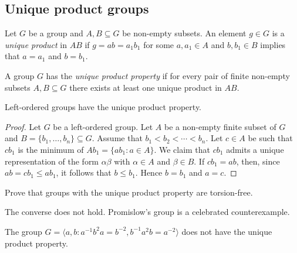 \begin{graybox}
\project
\section{Unique product groups}
\label{section:UP}

Let $G$ be a group and $A,B\subseteq G$ be non-empty subsets. 
An element $g\in G$ is a \emph{unique product} in $AB$ if $g=ab=a_1b_1$ for some
$a,a_1\in
A$ and $b,b_1\in B$ implies that $a=a_1$ and $b=b_1$.

\begin{definition}
	A group $G$ has the \emph{unique product property} if 
	for every pair of finite non-empty subsets $A,B\subseteq G$ there exists at least one
	unique product in $AB$.
\end{definition}

\begin{proposition}
    Left-ordered groups have the unique product property.
\end{proposition}

\begin{proof}
    Let $G$ be a left-ordered group. 
	Let $A$ be a non-empty finite subset of $G$ and $B=\{b_1,\dots,b_n\}\subseteq G$. 
	Assume that $b_1<b_2<\cdots<b_n$. Let $c\in A$ be such that $cb_1$ is the 
	minimum of $Ab_1=\{ab_1:a\in A\}$. We claim that $cb_1$ admits a unique
	representation of the form $\alpha\beta$ with $\alpha\in A$ and 
	$\beta\in B$. If $cb_1=ab$, then, since $ab=cb_1\leq ab_1$, it follows that 
	$b\leq b_1$. Hence $b=b_1$ and $a=c$. 
\end{proof}

\begin{xca}
	Prove that groups with the unique product property are
	torsion-free.
\end{xca}

The converse does not hold. 
Promislow's group is a celebrated counterexample.

\begin{theorem}[Promislow]
    The group $G=\langle a,b:a^{-1}b^2a=b^{-2},b^{-1}a^2b=a^{-2}\rangle$
    does not have the unique product property.
\end{theorem}


\end{graybox}
